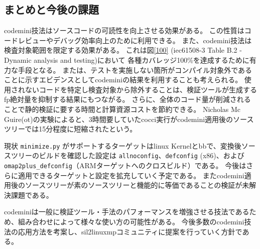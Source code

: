 \subsection{まとめと今後の課題}
\acrshort{codemini}技法はソースコードの可読性を向上させる効果がある。
この性質はコードレビューやデバッグ効率向上のために利用できる。
また、\acrshort{codemini}技法は検査対象範囲を限定する効果がある。
これは図\ref{100} (\acrshort{iec61508}-3 Table B.2 - Dynamic analysis and testing)において
各種カバレッジ100\%を達成するために有力な手段となる。
または、テストを実施しない箇所がコンパイル対象外であることに示すエビデンスとして\acrshort{codemini}の結果を利用することも考えられる。
使用されないコードを特定し検査対象から除外することは、検証ツールが生成する\acrshort{fp}絶対量を抑制する結果にもつながる。
さらに、全体のコード量が削減されることで静的検証に要する時間と計算資源コストを節約できる。
Nicholas Mc Guire(\acrshort{ot})の実験によると、3時間要していた\acrshort{cocci}実行が\acrshort{codemini}適用後のソースツリーでは15分程度に短縮されたという。
\par
現状 \verb|minimize.py| がサポートするターゲットは\acrshort{linux} Kernelと\acrshort{bb}で、変換後ソースツリーのビルドを確認した設定は \verb|allnoconfig|、\verb|defconfig| (x86)、および \verb|omap2plus_defconfig|（ARMターゲットへのクロスビルド）である。
今後はさらに適用できるターゲットと設定を拡充していく予定である。
また\acrshort{codemini}適用後のソースツリーが素のソースツリーと機能的に等価であることの検証が未解決課題である。
\par
\acrshort{codemini}は一般に検証ツール・手法のパフォーマンスを増強させる技法であるため、組み合わせによって様々な使い方の可能性がある。
今後多数の\acrshort{codemini}技法の応用方法を考案し、\acrshort{sil2linuxmp}コミュニティに提案を行っていく方針である。
